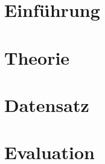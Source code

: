 \documentclass[12pt,ngerman,seminar]{dbvstudentwork}
\begin{document}
	
	\begin{dbvstudentworkTitlepage}
		
		
		
		
		\Deadline{\today}
		
		
	\end{dbvstudentworkTitlepage}
	
	\tableofcontents
	\clearpage
	
	
	\section{Einführung}
	\label{sec:introduction}
		
		
	\section{Theorie}
	\label{sec:theorie}
		
	
	\section{Datensatz}
	\label{sec:dataset}
		
		
	\section{Evaluation}
	\label{sec:evaluation}
		
		
\end{document}
